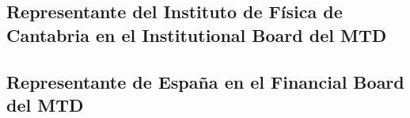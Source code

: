\documentclass[a4paper, 11pt, twoside, openright]{report}
\begin{document}
\subsection{Representante del Instituto de Física de Cantabria en el Institutional Board del MTD}

\subsection{Representante de España en el Financial Board del MTD}

\end{document}
